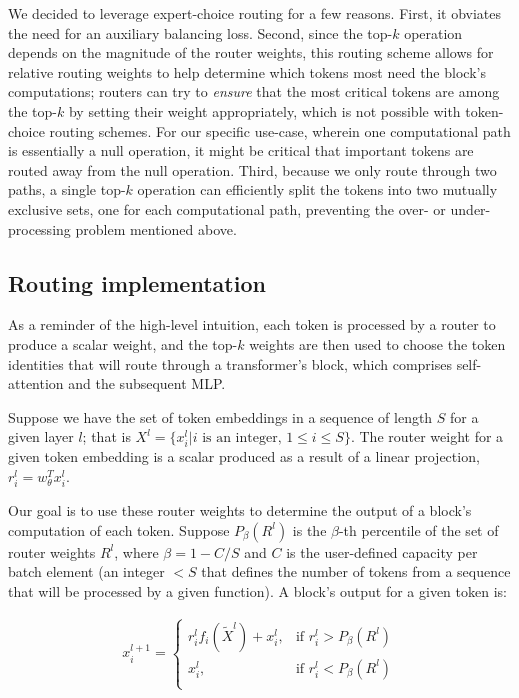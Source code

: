 \documentclass[11pt, a4paper, onecolumn, logo, copyright]{googledeepmind}
\begin{document}
We decided to leverage expert-choice routing for a few reasons. First, it obviates the need for an auxiliary balancing loss. Second, since the top-$k$ operation depends on the magnitude of the router weights, this routing scheme allows for relative routing weights to help determine which tokens most need the block's computations; routers can try to \emph{ensure} that the most critical tokens are among the top-$k$ by setting their weight appropriately, which is not possible with token-choice routing schemes. For our specific use-case, wherein one computational path is essentially a null operation, it might be critical that important tokens are routed away from the null operation. Third, because we only route through two paths, a single top-$k$ operation can efficiently split the tokens into two mutually exclusive sets, one for each computational path, preventing the over- or under-processing problem mentioned above. 

\subsection{Routing implementation}
\label{sec:routing-implementation}
As a reminder of the high-level intuition, each token is processed by a router to produce a scalar weight, and the top-$k$ weights are then used to choose the token identities that will route through a transformer's block, which comprises self-attention and the subsequent MLP. 

Suppose we have the set of token embeddings in a sequence of length $S$ for a given layer $l$; that is $X^l = \{x_i^l | i \text{ is an integer, }1 \leq i \leq S \}$.  The router weight for a given token embedding is a scalar produced as a result of a linear projection, $r_i^l=w_\theta^Tx_i^l$. 

Our goal is to use these router weights to determine the output of a block's computation of each token. Suppose $P_\beta(R^l)$ is the $\beta$-th percentile of the set of router weights $R^l$, where $\beta=1 - C/S$ and $C$ is the user-defined capacity per batch element (an integer $<S$ that defines the number of tokens from a sequence that will be processed by a given function). A block's output for a given token is:

\begin{align}
    x_i^{l+1} = 
    \begin{cases}
    r_i^l f_i(\tilde{X}^l) + x_i^l, & \text{if } r_i^l > P_\beta(R^l) \\
    x_i^l, & \text{if } r_i^l < P_\beta(R^l)  \\
    \end{cases}
\end{align}
\end{document}
